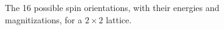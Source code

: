 \documentclass[12pt]{article}
\numberwithin{equation}{section}
\begin{document}
\begin{figure}[ht]
\begin{center}
\caption{The 16 possible spin orientations, with their energies and magnitizations, for a $2\times2$ lattice.}
\label{fig:spins2x2}
\end{center}
\end{figure}
\end{document}
